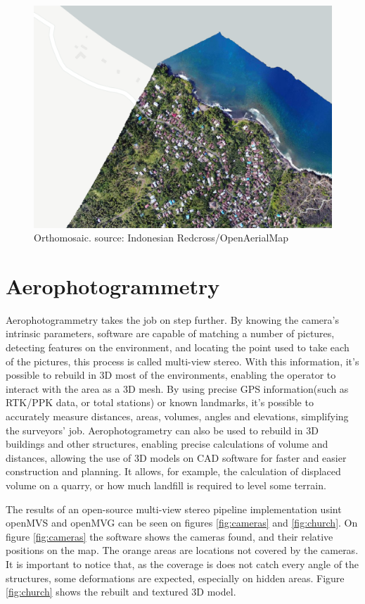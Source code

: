 \begin{figure}
\centering
  \includegraphics[width=\linewidth]{figs/orthomosaic.png}
  \caption{Orthomosaic. source: Indonesian Redcross/OpenAerialMap}
  \label{fig:orthomosaic}
\end{figure}


\section{Aerophotogrammetry}

Aerophotogrammetry takes the job on step further. 
%
By knowing the camera's intrinsic parameters, software are capable of matching a number of pictures, detecting features on the environment, and locating the point used to take each of the pictures, this process is called multi-view stereo. 
%
With this information, it's possible to rebuild in 3D most of the environments, enabling the operator to interact with the area as a 3D mesh.
%
By using precise GPS information(such as RTK/PPK data, or total stations) or known landmarks, it's possible to accurately measure distances, areas, volumes, angles and elevations, simplifying the surveyors' job.
%
Aerophotogrametry can also be used to rebuild in 3D buildings and other structures, enabling precise calculations of volume and distances, allowing the use of 3D models on CAD software for faster and easier construction and planning.
%
It allows, for example, the calculation of displaced volume on a quarry, or how much landfill is required to level some terrain.
%

The results of an open-source multi-view stereo pipeline implementation usint openMVS\cite{openmvs} and openMVG\cite{openmvg} can be seen on figures \ref{fig:cameras} and \ref{fig:church}. 
%
On figure \ref{fig:cameras} the software shows the cameras found, and their relative positions on the map. 
%
The orange areas are locations not covered by the cameras. 
%
It is important to notice that, as the coverage is does not catch every angle of the structures, some deformations are expected, especially on hidden areas. 
%
Figure \ref{fig:church} shows the rebuilt and textured 3D model.
 

